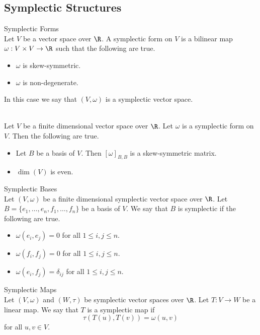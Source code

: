 \documentclass[a4paper]{article}
\begin{document}
\subsection{Symplectic Structures}
\begin{defn}{Symplectic Forms}{}\\
Let $V$ be a vector space over $\R$. A symplectic form on $V$ is a bilinear map $\omega:V\times V\to\R$ such that the following are true. 
\begin{itemize}
\item $\omega$ is skew-symmetric. 
\item $\omega$ is non-degenerate. 
\end{itemize}
In this case we say that $(V,\omega)$ is a symplectic vector space. 
\end{defn}

\begin{prp}{}{}\\
Let $V$ be a finite dimensional vector space over $\R$. Let $\omega$ is a symplectic form on $V$. Then the following are true. 
\begin{itemize}
\item Let $B$ be a basis of $V$. Then $[\omega]_{B,B}$ is a skew-symmetric matrix. 
\item $\dim(V)$ is even. 
\end{itemize}
\end{prp}

\begin{defn}{Symplectic Bases}{}\\
Let $(V,\omega)$ be a finite dimensional symplectic vector space over $\R$. Let $B=\{e_1,\dots,e_n,f_1,\dots,f_n\}$ be a basis of $V$. We say that $B$ is symplectic if the following are true. 
\begin{itemize}
\item $\omega(e_i,e_j)=0$ for all $1\leq i,j\leq n$. 
\item $\omega(f_i,f_j)=0$ for all $1\leq i,j\leq n$. 
\item $\omega(e_i,f_j)=\delta_{ij}$ for all $1\leq i,j\leq n$. 
\end{itemize}
\end{defn}

\begin{defn}{Symplectic Maps}{}\\
Let $(V,\omega)$ and $(W,\tau)$ be symplectic vector spaces over $\R$. Let $T:V\to W$ be a linear map. We say that $T$ is a symplectic map if $$\tau(T(u),T(v))=\omega(u,v)$$ for all $u,v\in V$. 
\end{defn}
\end{document}
